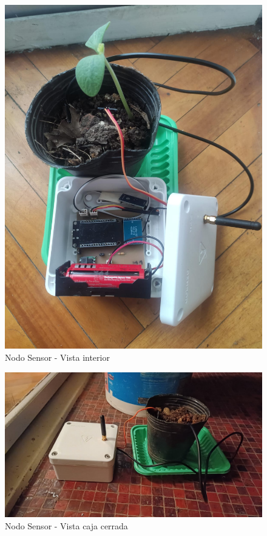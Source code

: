 \begin{figure}[H]
	\centering
	\includegraphics[scale=0.25]{Figures/Pruebas/nodoSensor2.jpeg}
	\caption{Nodo Sensor - Vista interior}
	\label{fig:nodoSensor1EstFinal}
\end{figure}

\begin{figure}[H]
	\centering
	\includegraphics[scale=0.25]{Figures/Pruebas/nodoSensor1.jpeg}
	\caption{Nodo Sensor - Vista caja cerrada}
	\label{fig:nodoSensor2EstFinal}
\end{figure}

